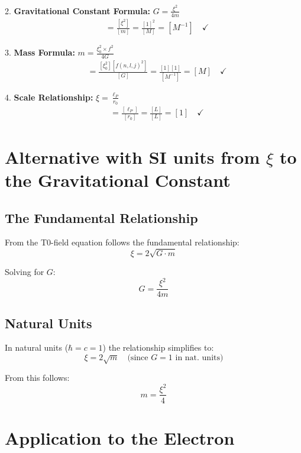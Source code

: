 \documentclass[12pt,a4paper]{article}
\newcommand{\xifunc}{f(n,l,j)}
\theoremstyle{definition}
\begin{document}
		2. \textbf{Gravitational Constant Formula:} $G = \frac{\xi^2}{4m}$
		\begin{align}
			[G] &= \frac{[\xi^2]}{[m]} = \frac{[1]^2}{[M]} = [M^{-1}] \quad \checkmark
		\end{align}
		
		3. \textbf{Mass Formula:} $m = \frac{\xi_0^2 \times f^2}{4G}$
		\begin{align}
			[m] &= \frac{[\xi_0^2][\xifunc^2]}{[G]} = \frac{[1][1]}{[M^{-1}]} = [M] \quad \checkmark
		\end{align}
		
		4. \textbf{Scale Relationship:} $\xi = \frac{\ell_P}{r_0}$
		\begin{align}
			[\xi] &= \frac{[\ell_P]}{[r_0]} = \frac{[L]}{[L]} = [1] \quad \checkmark
		\end{align}
	\section{Alternative with SI units from $\xi$ to the Gravitational Constant}

\subsection{The Fundamental Relationship}

From the T0-field equation follows the fundamental relationship:
\begin{equation}
	\xi = 2\sqrt{G \cdot m}
\end{equation}

Solving for $G$:
\begin{equation}
	\boxed{G = \frac{\xi^2}{4m}}
\end{equation}

\subsection{Natural Units}

In natural units ($\hbar = c = 1$) the relationship simplifies to:
\begin{equation}
	\xi = 2\sqrt{m} \quad \text{(since } G = 1 \text{ in nat. units)}
\end{equation}

From this follows:
\begin{equation}
	m = \frac{\xi^2}{4}
\end{equation}

\section{Application to the Electron}
\end{document}
